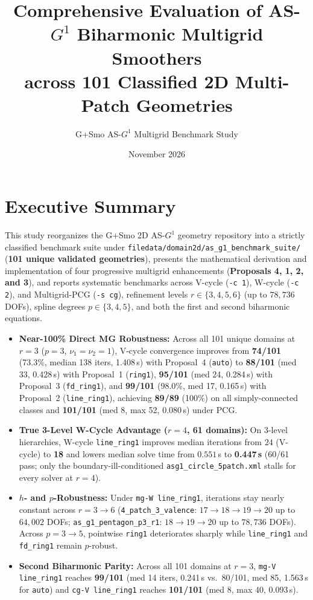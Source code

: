 \documentclass[10pt,a4paper]{article}
\title{\textbf{Comprehensive Evaluation of AS-$G^1$ Biharmonic Multigrid Smoothers\\across 101 Classified 2D Multi-Patch Geometries}}
\author{G+Smo AS-$G^1$ Multigrid Benchmark Study}
\date{November 2026}
\begin{document}
\maketitle
\tableofcontents
\bigskip

\section{Executive Summary}
This study reorganizes the G+Smo 2D AS-$G^1$ geometry repository into a strictly classified benchmark suite under \texttt{filedata/domain2d/as\_g1\_benchmark\_suite/} (\textbf{101 unique validated geometries}), presents the mathematical derivation and implementation of four progressive multigrid enhancements (\textbf{Proposals 4, 1, 2, and 3}), and reports systematic benchmarks across V-cycle (\texttt{-c 1}), W-cycle (\texttt{-c 2}), and Multigrid-PCG (\texttt{-s cg}), refinement levels $r \in \{3,4,5,6\}$ (up to $78{,}736$ DOFs), spline degrees $p \in \{3,4,5\}$, and both the first and second biharmonic equations.

\begin{itemize}
  \item \textbf{Near-100\% Direct MG Robustness:} Across all 101 unique domains at $r=3$ ($p=3$, $\nu_1=\nu_2=1$), V-cycle convergence improves from \textbf{74/101} (73.3\%, median 138 iters, 1.408\,s) with Proposal~4 (\texttt{auto}) to \textbf{88/101} (med 33, 0.428\,s) with Proposal~1 (\texttt{ring1}), \textbf{95/101} (med 24, 0.284\,s) with Proposal~3 (\texttt{fd\_ring1}), and \textbf{99/101} (98.0\%, med 17, 0.165\,s) with Proposal~2 (\texttt{line\_ring1}), achieving \textbf{89/89} (100\%) on all simply-connected classes and \textbf{101/101} (med 8, max 52, 0.080\,s) under PCG.
  \item \textbf{True 3-Level W-Cycle Advantage ($r=4$, 61 domains):} On 3-level hierarchies, W-cycle \texttt{line\_ring1} improves median iterations from $24$ (V-cycle) to \textbf{18} and lowers median solve time from $0.551\,$s to \textbf{0.447\,s} (60/61 pass; only the boundary-ill-conditioned \texttt{asg1\_circle\_5patch.xml} stalls for every solver at $r=4$).
  \item \textbf{$h$- and $p$-Robustness:} Under \texttt{mg-W line\_ring1}, iterations stay nearly constant across $r=3\to 6$ (\texttt{4\_patch\_3\_valence}: $17\to 18\to 19\to 20$ up to $64{,}002$ DOFs; \texttt{as\_g1\_pentagon\_p3\_r1}: $18\to 19\to 20$ up to $78{,}736$ DOFs). Across $p=3\to 5$, pointwise \texttt{ring1} deteriorates sharply while \texttt{line\_ring1} and \texttt{fd\_ring1} remain $p$-robust.
  \item \textbf{Second Biharmonic Parity:} Across all 101 domains at $r=3$, \texttt{mg-V line\_ring1} reaches \textbf{99/101} (med 14 iters, 0.241\,s vs.\ 80/101, med 85, 1.563\,s for \texttt{auto}) and \texttt{cg-V line\_ring1} reaches \textbf{101/101} (med 8, max 40, 0.093\,s).
\end{itemize}
\end{document}
